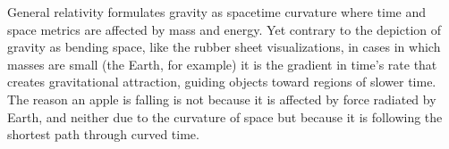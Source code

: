 General relativity formulates gravity as spacetime curvature where time and space metrics are affected by mass and energy. Yet contrary to the depiction of gravity as bending space, like the rubber sheet visualizations, in cases in which masses are small (the Earth, for example) it is the gradient in time's rate that creates gravitational attraction, guiding objects toward regions of slower time. The reason an apple is falling is not because it is affected by force radiated by Earth, and neither due to the curvature of space but because it is following the shortest path through curved time.
